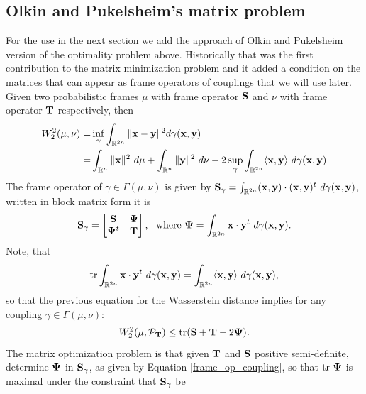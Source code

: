 \documentclass{amsart}
\numberwithin{equation}{section}
\newcommand\bS{{\bf S}}
\newcommand\bT{{\bf T}}
\newcommand\R{{\mathbb R}}
\newcommand\tr{{\operatorname{tr}}}
\theoremstyle{plain}
\theoremstyle{definition}
\begin{document}
\subsection{Olkin and Pukelsheim's matrix problem}
For the use in the next section we add the approach of Olkin and Pukelsheim version \cite{olkin1982distance} of the optimality problem above.  
Historically that was the first contribution to the matrix minimization problem and it added a condition on the 
matrices that can appear as frame operators of couplings that we will use later. \\

Given two probabilistic frames $\mu$ with frame operator $\bS$ and $\nu$ with frame operator $\bT$ respectively, then 
\begin{equation*}
\begin{split}
 W^2_2(\mu, \nu)=&\inf_{\gamma} \int_{\R^{2n}} \|{\bf x}-{\bf y} \|^2 d \gamma({\bf x},{\bf y})\\ =&\int_{\R^n} \|{\bf x}\|^2 \ d\mu + \int_{\R^n} \|{\bf y}\|^2 \ d\nu-  2 \sup_{\gamma} \int_{\R^{2n}} \langle {\bf x}, {\bf y}\rangle\ d\gamma({\bf x},{\bf y})   
\end{split}    
\end{equation*} 
The frame operator of $\gamma \in \Gamma(\mu, \nu)$ is given by  
${\bf S}_{\gamma}=\int_{\R^{2n}} ({\bf x}, {\bf y})\cdot ({\bf x}, {\bf y})^t\ d \gamma({\bf x}, {\bf y})$, written   
in block matrix form it is   
\begin{equation}\label{frame_op_coupling}
\bS_{\gamma}=\begin{bmatrix}
\bS & {\bf \Psi} \\
{\bf \Psi}^t & \bT 
\end{bmatrix}, \ \text{ where }   {\bf \Psi}=\int_{\R^{2n}} {\bf x}\cdot {\bf y}^t \ d\gamma({\bf x},{\bf y}). 
\end{equation}
Note, that 
\[\tr \int_{\R^{2n}} {\bf x}\cdot {\bf y}^t \ d\gamma({\bf x},{\bf y}) = \int_{\R^{2n}} \langle {\bf x}, {\bf y}\rangle \ d\gamma({\bf x},{\bf y}), \] 
so that the previous equation for the Wasserstein distance implies for any coupling $\gamma \in \Gamma(\mu, \nu)$: 
\begin{equation}\label{Wasserstein_trace_estimate}
 W^2_2(\mu, \mathcal{P}_{\bf T}) \leq \tr ({\bf S} + {\bf T} - 2 {\bf \Psi}). 
\end{equation}
The matrix optimization problem is that given $\bT$ and $\bS$ positive semi-definite, determine ${\bf \Psi}$ in  
$\bS_{\gamma}$, as given by Equation \ref{frame_op_coupling}, so that $\tr \ {\bf \Psi}$ is maximal under the constraint that $\bS_{\gamma}$ be  
\end{document}
